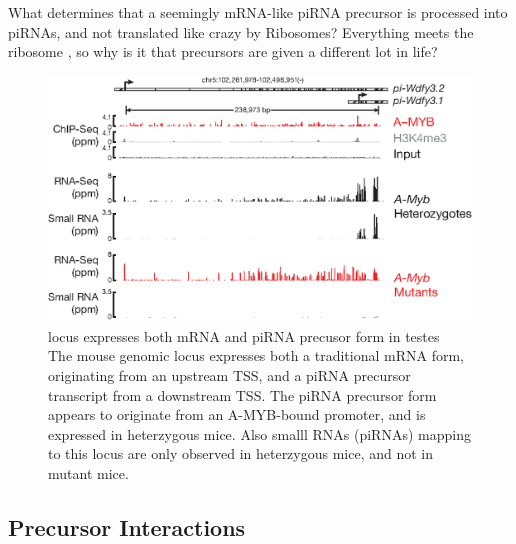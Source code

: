     What determines that a seemingly mRNA-like piRNA precursor is processed into piRNAs, and not translated like crazy by Ribosomes?  Everything meets the ribosome \citep{Guttman2013}, so why is it that precursors are given a different lot in life?

    \begin{figure} %
      \centering 
      \includegraphics{Figures/Discussion/pi-wdfy3.eps}
      \caption[\wdfy{} locus expresses both mRNA and piRNA precusor form in testes]
      {\wdfy{} locus expresses both mRNA and piRNA precusor form in testes\\[0.25cm]
        The mouse genomic locus \wdfy{} expresses both a traditional mRNA form, originating from an upstream TSS, and a piRNA precursor transcript from a downstream TSS. The piRNA precursor form appears to originate from an A-MYB-bound promoter, and is expressed in \amyb{} heterzygous mice. Also smalll RNAs (piRNAs) mapping to this locus are only observed in \amyb{} heterzygous mice, and not in \amyb{} mutant mice.
        }
      \label{Disc:fig:wdfy3}
      \end{figure}


  \subsection{Precursor Interactions}
    \label{Disc:subsec:Labeling of precursors}


